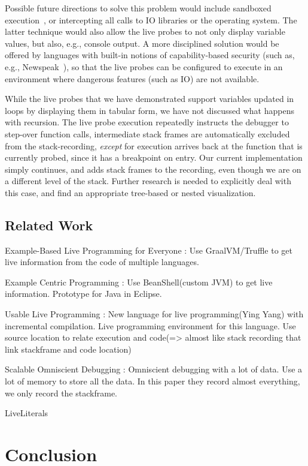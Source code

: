 \documentclass[english,submission]{programming}
\begin{document}
Possible future directions to solve this problem would include sandboxed execution~\cite{???}, or intercepting all calls to IO libraries or the operating system. The latter technique would also allow the live probes to not only display variable values, but also, e.g., console output. 
A more disciplined solution would be offered by languages with built-in notions of capability-based security (such as, e.g., Newspeak~\cite{Newspeak}), so that the live probes can be configured to execute in an environment where dangerous features (such as IO) are not available.  

While the live probes that we have demonstrated support variables updated in loops by displaying them in tabular form, we have not discussed what happens with recursion. The live probe execution repeatedly instructs the debugger to step-over function calls, intermediate stack frames are automatically excluded from the stack-recording, \textit{except} for execution arrives back at the function that is currently probed, since it has a breakpoint on entry. Our current implementation simply continues, and adds stack frames to the recording, even though we are on a different level of the stack. Further research is needed to explicitly deal with this case, and find an appropriate tree-based or nested visualization.

\subsection{Related Work}

Example-Based Live Programming for Everyone\cite{ExampleBasedGraalVM} : Use GraalVM/Truffle to get live information from the code of multiple languages.

Example Centric Programming\cite{ExampleCentric} : Use BeanShell(custom JVM) to get live information. Prototype for Java in Eclipse.

Usable Live Programming\cite{UsableLiveProgramming} : New language for live programming(Ying Yang) with incremental compilation. Live programming environment for this language.
Use source location to relate execution and code(=> almost like stack recording that link stackframe and code location)

Scalable Omniscient Debugging\cite{ScalableOmniscient} : Omniscient debugging with a lot of data. Use a lot of memory to store all the data.
In this paper they record almost everything, we only record the stackframe.

LiveLiterals~\cite{LiveLiterals}

\section{Conclusion}
\label{sec:conclusion}

\printbibliography
\end{document}

